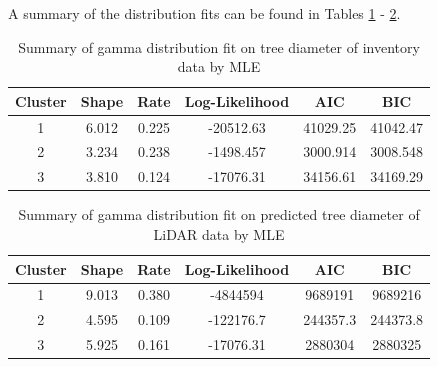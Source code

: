 A summary of the distribution fits can be found in Tables \ref{tab:fitdistrplus_inventory} - \ref{tab:fitdistrplus_lidar}.

\begin{table}[H]
\setlength\arrayrulewidth{1pt}  
\centering
\begin{adjustbox}{max width=\textwidth}
\begin{tabular}{|c|c|c|c|c|c|}
\hline
\rowcolor{Gray}
\textbf{Cluster} & \textbf{Shape} & \textbf{Rate} & \textbf{Log-Likelihood} & \textbf{AIC} & \textbf{BIC} \\ \hline
1                & 6.012          & 0.225        & -20512.63               & 41029.25     & 41042.47     \\ \hline
2                & 3.234          & 0.238         & -1498.457               & 3000.914     & 3008.548     \\ \hline
3                & 3.810          & 0.124         & -17076.31               & 34156.61     & 34169.29     \\ \hline
\end{tabular}
\end{adjustbox}
\caption{Summary of gamma distribution fit on tree diameter of inventory data by MLE}
\label{tab:fitdistrplus_inventory}
\end{table}


\begin{table}[H]
\setlength\arrayrulewidth{1pt}  
\centering
\begin{adjustbox}{max width=\textwidth}
\begin{tabular}{|c|c|c|c|c|c|}
\hline
\rowcolor{Gray}
\textbf{Cluster} & \textbf{Shape} & \textbf{Rate} & \textbf{Log-Likelihood} & \textbf{AIC} & \textbf{BIC} \\ \hline
1                & 9.013          & 0.380         & -4844594                & 9689191      & 9689216      \\ \hline
2                & 4.595          & 0.109         & -122176.7               & 244357.3     & 244373.8     \\ \hline
3                & 5.925          & 0.161         & -17076.31               & 2880304      & 2880325      \\ \hline
\end{tabular}
\end{adjustbox}
\caption{Summary of gamma distribution fit on predicted tree diameter of LiDAR data by MLE}
\label{tab:fitdistrplus_lidar}
\end{table}




